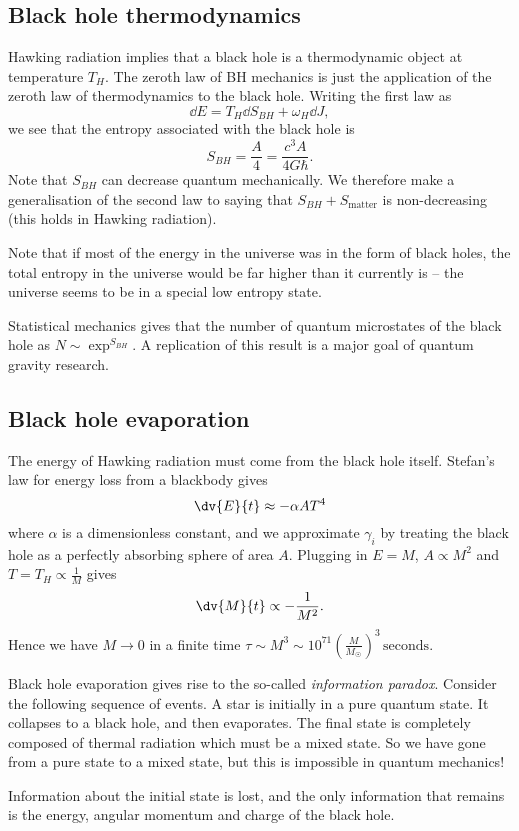\documentclass{jknotes}
\begin{document}
\subsection{Black hole thermodynamics}
Hawking radiation implies that a black hole is a thermodynamic object at temperature \(T_H\). The zeroth law of BH mechanics is just the application of the zeroth law of thermodynamics to the black hole. Writing the first law as
\begin{equation}
    \dd{E} = T_H \dd{S_{BH}} + \omega_H\dd{J},
\end{equation}
we see that the entropy associated with the black hole is
\begin{equation}
    S_{BH} = \frac{A}{4} = \frac{c^3A}{4G\hbar}.
\end{equation}
Note that \(S_{BH}\) can decrease quantum mechanically. We therefore make a generalisation of the second law to saying that \(S_{BH}+S_{\text{matter}}\) is non-decreasing (this holds in Hawking radiation). 

Note that if most of the energy in the universe was in the form of black holes, the total entropy in the universe would be far higher than it currently is -- the universe seems to be in a special low entropy state.

Statistical mechanics gives that the number of quantum microstates of the black hole as \(N\sim \exp^{S_{BH}}\). A replication of this result is a major goal of quantum gravity research.

\subsection{Black hole evaporation}
The energy of Hawking radiation must come from the black hole itself. Stefan's law for energy loss from a blackbody gives
\begin{equation}
    \dv{E}{t} \approx - \alpha A T^4
\end{equation}
where \(\alpha\) is a dimensionless constant, and we approximate \(\gamma_i\) by treating the black hole as a perfectly absorbing sphere of area \(A\). Plugging in \(E=M\), \(A\propto M^2\) and \(T=T_H\propto\frac{1}{M}\) gives
\begin{equation}
    \dv{M}{t}\propto -\frac{1}{M^2}.
\end{equation}
Hence we have \(M\to0\) in a finite time \(\tau \sim M^3 \sim 10^{71}(\frac{M}{M_{\astrosun}})^3\,\text{seconds}\).

Black hole evaporation gives rise to the so-called \emph{information paradox}. Consider the following sequence of events. A star is initially in a pure quantum state. It collapses to a black hole, and then evaporates. The final state is completely composed of thermal radiation which must be a mixed state. So we have gone from a pure state to a mixed state, but this is impossible in quantum mechanics!

Information about the initial state is lost, and the only information that remains is the energy, angular momentum and charge of the black hole.
\end{document}
